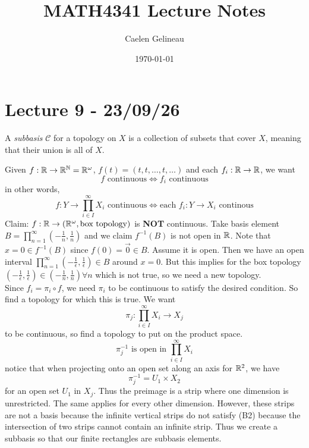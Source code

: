 \documentclass[11pt]{article}
\title{MATH4341 Lecture Notes}
\author{Caelen Gelineau}
\date{\today}
\begin{document}
\maketitle
\tableofcontents

\newpage
\section{Lecture 9 - 23/09/26}
\begin{definition}
    A \textit{subbasis} $\mathcal{C}$ for a topology on $X$ is a collection of subsets that cover $X$, meaning that their union is all of $X$.
\end{definition}
\begin{example}
    Given $f: \mathbb{R} \rightarrow \mathbb{R}^{\mathbb{N}} = \mathbb{R}^\omega$, $f(t) = (t,t,\dots, t, \dots)$ and each $f_i: \mathbb{R} \rightarrow \mathbb{R}$, we want 
    \[
        f \text{ continuous} \iff f_i \text{ continuous}
    \]
   in other words,
   \[
    f: Y \rightarrow \prod_{i\in I}^{\infty} X_i \text{ continuous} \iff \text{each } f_i: Y \rightarrow X_i \text{ continous} 
   \]
    Claim: $f: \mathbb{R} \rightarrow (\mathbb{R}^\omega, \text{box topology})$ is \textbf{NOT} continuous.
    Take basis element $B = \prod_{n = 1}^{\infty} (-\frac{1}{n}, \frac{1}{n})$ and we claim $f^{-1}(B)$ is not open in $\mathbb{R}$.
    Note that $x = 0 \in f^{-1}(B)$ since $f(0) = \overrightarrow{0} \in B$. Assume it is open. Then we have an open interval $\prod_{n=1}^{\infty}(-\frac{1}{\epsilon}, \frac{1}{\epsilon}) \in B $ around $x = 0$.
    But this implies for the box topology $(-\frac{1}{\epsilon}, \frac{1}{\epsilon}) \in (-\frac{1}{n}, \frac{1}{n}) \forall n$ which is not true, so we need a new topology.\\
    Since $f_i = \pi_i \circ f$, we need $\pi_i$ to be continuous to satisfy the desired condition. So find a topology for which this is true. We want
    \[
        \pi_j: \prod_{i \in I}^{\infty} X_i \rightarrow X_j 
    \]
    to be continuous, so find a topology to put on the product space.
    \[
        \pi_j^{-1} \text{ is open in } \prod_{i \in I}^{\infty} X_i  
    \]
    notice that when projecting onto an open set along an axis for $\mathbb{R}^2$, we have
    \[
        \pi_j^{-1} = U_1 \times X_2
    \]
    for an open set $U_1$ in $X_j$. Thus the preimage is a strip where one dimension is unrestricted. The same applies for every other dimension. 
    However, these strips are not a basis because the infinite vertical strips do not satisfy (B2) because the intersection of two strips cannot contain an infinite strip.
    Thus we create a subbasis so that our finite rectangles are subbasis elements.

\end{example}
\end{document}
